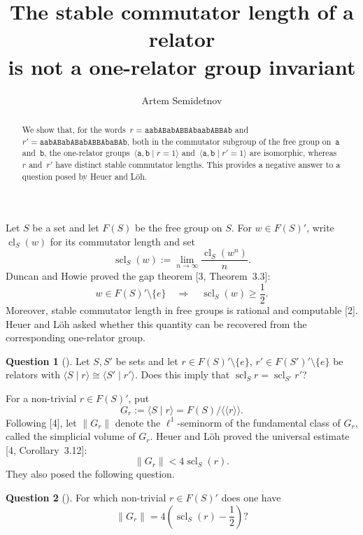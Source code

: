 \documentclass[12pt,a4paper,oneside]{amsart}
\title[Stable commutator length of a relator]{The stable commutator length of a relator\\ is not a one-relator group invariant}
\author{Artem Semidetnov}
\date{}
\DeclareMathOperator{\scl}{scl}
\newcommand{\nc}[1]{\langle\!\langle #1 \rangle\!\rangle}
\newcommand{\genrel}[2]{\langle #1 \mid #2 \rangle}
\theoremstyle{plain}
\theoremstyle{definition}
\newtheorem*{Question}{Question}
\begin{document}
\vspace*{-15mm}

\begin{abstract}
We show that, for the words~\mbox{{\scriptsize \(r=\mathtt{aabABabABBAbaabABBAb}\)}} and~\mbox{{\scriptsize \(r'=\mathtt{aabABabABabABBAbaBAb}\)}}, both in the commutator subgroup of the free group on~\(\mathtt{a}\) and~\(\mathtt{b}\), the one-relator groups~\mbox{\(\langle \mathtt{a,b}\mid r=1\rangle\)} and~\mbox{\(\langle \mathtt{a,b}\mid r'=1\rangle\)} are isomorphic, whereas~\(r\) and~\(r'\) have distinct stable commutator lengths. This provides a negative answer to a question posed by Heuer and L\"oh.
\end{abstract}

\maketitle

Let \(S\) be a set and let \(F(S)\) be the free group on \(S\). For \(w\in F(S)'\), write \(\operatorname{cl}_S(w)\) for its commutator length and set
\[
  \scl_S(w):=\lim_{n\to\infty}\frac{\operatorname{cl}_S(w^n)}{n}.
\]
Duncan and Howie proved the gap theorem [3, Theorem~3.3]:
\[
  w\in F(S)'\setminus\{e\}\quad\Longrightarrow\quad \scl_S(w)\geq \frac12.
\]
Moreover, stable commutator length in free groups is rational and computable [2]. Heuer and L\"oh asked whether this quantity can be recovered from the corresponding one-relator group.

\begin{Question}[{\normalfont [4, Question~1.3(1)]}]
Let \(S,S'\) be sets and let \(r\in F(S)'\setminus\{e\}\), \(r'\in F(S')'\setminus\{e\}\) be relators with \(\genrel{S}{r}\cong\genrel{S'}{r'}\). Does this imply that \(\scl_S r=\scl_{S'}r'\)?
\end{Question}

For a non-trivial \(r\in F(S)'\), put
\[
  G_r:=\genrel{S}{r}=F(S)/\nc r.
\]
Following [4], let \(\lVert G_r\rVert\) denote the \(\ell^1\)-seminorm of the fundamental class of \(G_r\), called the simplicial volume of \(G_r\). Heuer and L\"oh proved the universal estimate [4, Corollary~3.12]:
\[
  \lVert G_r\rVert<4\scl_S(r).
\]
They also posed the following question.

\begin{Question}[{\normalfont [4, Question~1.2]}]
For which non-trivial \(r\in F(S)'\) does one have
\[
  \lVert G_r\rVert=4\left(\scl_S(r)-\frac12\right)?
\]
\end{Question}
\end{document}

